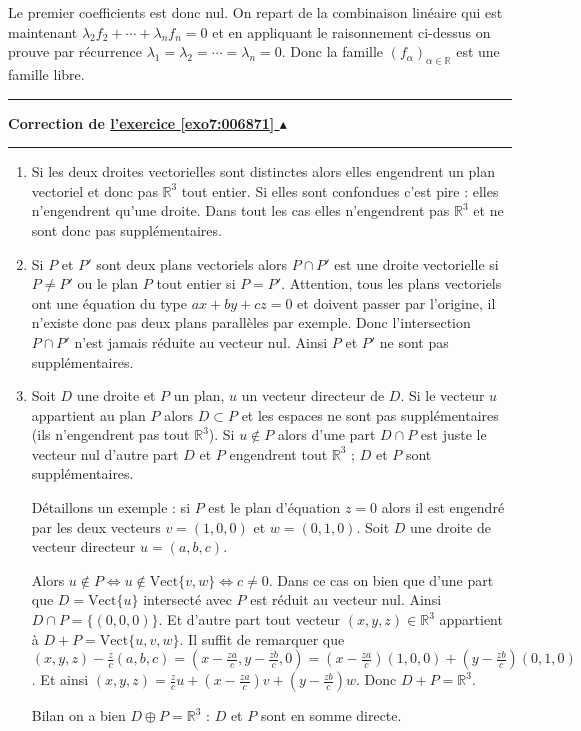 \documentclass[11pt,a4paper]{article}
\newcommand{\Rr}{\mathbb{R}} \newcommand{\R}{\mathbb{R}}
\newcounter{exo}
\newcommand{\correction}[1]{\hypertarget{cor7:#1}{}\label{cor7:#1}{\bf Correction de \hyperlink{exo7:#1}{l'exercice \ref{exo7:#1} $\blacktriangle$}}\vspace{1mm}\hrule\vspace{1mm}}
\newcommand{\fincorrection}{\vspace{1mm}\hrule\vspace*{7mm}}
\begin{document}
Le premier coefficients est donc nul. On repart de la combinaison linéaire qui est maintenant
$\lambda_2 f_2+\cdots + \lambda_n f_n=0$ et en appliquant le raisonnement ci-dessus 
on prouve par récurrence $\lambda_1=\lambda_2=\cdots=\lambda_n=0$.
 Donc la famille $(f_\alpha)_{\alpha\in\Rr}$ est une famille libre.
\fincorrection
\correction{006871}
\begin{enumerate}
  \item Si les deux droites vectorielles sont distinctes alors elles engendrent un plan vectoriel 
et donc pas $\Rr^3$ tout entier. Si elles sont confondues c'est pire : elles n'engendrent qu'une droite.
Dans tout les cas elles n'engendrent pas $\Rr^3$ et ne sont donc pas supplémentaires.
  \item Si $P$ et $P'$ sont deux plans vectoriels alors $P\cap P'$ est une droite vectorielle si $P \neq P'$
ou le plan $P$ tout entier si $P=P'$. Attention, tous les plans vectoriels ont une équation du type 
$ax+by+cz=0$ et doivent passer par l'origine, il n'existe donc pas deux plans parallèles par exemple.
Donc l'intersection $P\cap P'$ n'est jamais réduite au vecteur nul. Ainsi $P$ et $P'$ ne sont pas supplémentaires.

  \item Soit $D$ une droite et $P$ un plan, $u$ un vecteur directeur de $D$. 
Si le vecteur $u$ appartient au plan $P$ alors $D\subset P$ et les espaces ne sont pas suppl\'ementaires 
(ils n'engendrent pas tout $\Rr^3$). 
Si $u \notin P$ alors d'une part $D\cap P$ est juste le vecteur nul
d'autre part $D$ et $P$ engendrent tout $\Rr^3$ ; $D$ et $P$ sont supplémentaires.

Détaillons un exemple : si $P$ est le plan d'équation $z=0$ alors il est engendré par les deux vecteurs $v=(1,0,0)$ et $w=(0,1,0)$.
Soit $D$ une droite de vecteur directeur $u=(a,b,c)$.

Alors  $u \notin P \iff u \notin \text{Vect}\{v,w\} \iff c \neq 0$.
Dans ce cas on bien que d'une part que $D = \text{Vect}\{ u\}$ intersecté avec $P$ est réduit au vecteur nul.
Ainsi $D\cap P = \{(0,0,0)\}$.
Et d'autre part tout vecteur $(x,y,z)\in \Rr^3$ appartient à $D+P = \text{Vect}\{u,v,w\}$.
Il suffit de remarquer que $(x,y,z) - \frac zc (a,b,c) = (x-\frac{za}{c},y-\frac{zb}{c},0) = (x-\frac{za}{c}) (1,0,0) + 
(y-\frac{zb}{c})(0,1,0)$. Et ainsi $(x,y,z)= \frac zc u + (x-\frac{za}{c}) v + 
(y-\frac{zb}{c}) w$. Donc $D+P = \Rr^3$.

Bilan on a bien $D\oplus P = \Rr^3$ : $D$ et $P$ sont en somme directe.

\end{enumerate}
\end{document}
